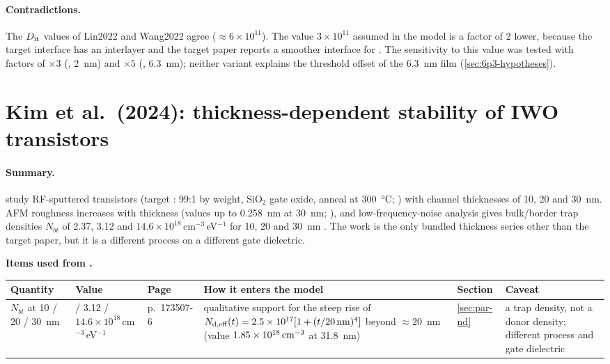 \paragraph{Contradictions.}
The $D_{\mathrm{it}}$ values of Lin2022 and Wang2022 agree ($\approx 6\times10^{11}$). The value
$3\times10^{11}$ assumed in the model is a factor of 2 lower, because the target interface has an
\AlO{} interlayer and the target paper reports a smoother interface for \IWO{}
\citep[p.~8]{Januar2026}. The sensitivity to this value was tested with factors of $\times3$
(, \SI{2}{nm}) and $\times5$ (, \SI{6.3}{nm}); neither variant explains the
threshold offset of the \SI{6.3}{nm} film (\cref{sec:6p3-hypotheses}).

\section{Kim et al.\ (2024): thickness-dependent stability of IWO transistors}
\label{sec:lit-kim2024}

\paragraph{Summary.}
\citet{Kim2024} study RF-sputtered \IWO{} transistors (target \InO:\WO{} 99:1 by weight, SiO$_2$ gate
oxide, anneal at \SI{300}{\degreeCelsius}; \citealp[p.~173507-2]{Kim2024}) with channel thicknesses
of 10, 20 and \SI{30}{nm}. AFM roughness increases with thickness (values up to \SI{0.258}{nm} at
\SI{30}{nm}; \citealp[p.~173507-3]{Kim2024}), and low-frequency-noise analysis gives bulk/border trap
densities $N_{bt}$ of 2.37, 3.12 and $14.6\times10^{18}$\,cm$^{-3}$\,eV$^{-1}$ for 10, 20 and
\SI{30}{nm} \citep[p.~173507-6]{Kim2024}. The work is the only bundled \IWO{} thickness series other
than the target paper, but it is a different process on a different gate dielectric.

\begin{usedbox}
\textbf{Items used from \citet{Kim2024}.}\par\smallskip
\footnotesize
\begin{tabularx}{\linewidth}{@{}>{\raggedright\arraybackslash}p{1.9cm}>{\raggedright\arraybackslash}p{2.0cm}>{\raggedright\arraybackslash}p{1.5cm}>{\raggedright\arraybackslash}X>{\raggedright\arraybackslash}p{1.35cm}>{\raggedright\arraybackslash}X@{}}
\toprule
Quantity & Value & Page & How it enters the model & Section & Caveat \\
\midrule
$N_{bt}$ at 10 / 20 / \SI{30}{nm} & 2.37 / 3.12 / $14.6\times10^{18}$\,cm$^{-3}$\,eV$^{-1}$ & p.~173507-6 & qualitative support for the steep rise of $N_{\mathrm{d,eff}}(t) = 2.5\times10^{17}[1+(t/20\,\mathrm{nm})^4]$ beyond $\approx$\SI{20}{nm} (value $1.85\times10^{18}\,\mathrm{cm}^{-3}$ at \SI{31.8}{nm}) & \cref{sec:par-nd} & a trap density, not a donor density; different process and gate dielectric \\
\bottomrule
\end{tabularx}
\end{usedbox}

